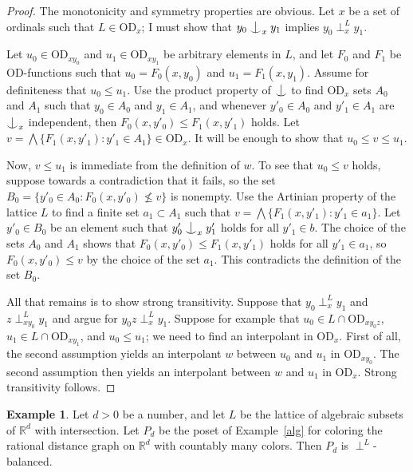 \documentclass{article}
\newcommand{\vd}{\mathrm{OD}}
\newcommand{\forkindep}[1][]{%
  \mathrel{
    \mathop{
      \vcenter{
        \hbox{\oalign{\noalign{\kern-.3ex}\hfil$\vert$\hfil\cr
              \noalign{\kern-.7ex}
              $\smile$\cr\noalign{\kern-.3ex}}}
      }
    }\displaylimits_{#1}
  }
}
\theoremstyle{definition}
\newtheorem{example}[theorem]{Example}
\begin{document}
\begin{proof}
The monotonicity and symmetry properties are obvious. Let $x$ be a set of ordinals such that $L\in\vd_x$; I must show that $y_0\forkindep_x y_1$ implies $y_0\perp^L_xy_1$.

Let $u_0\in \vd_{xy_0}$ and $u_1\in\vd_{xy_1}$ be arbitrary elements in $L$, and let $F_0$ and $F_1$ be $\vd$-functions such that $u_0=F_0(x, y_0)$ and $u_1=F_1(x, y_1)$. Assume for definiteness that $u_0\leq u_1$. Use the product property of $\forkindep$ to find $\vd_{x}$ sets $A_0$ and $A_1$ such that $y_0\in A_0$ and $y_1\in A_1$, and whenever $y'_0\in A_0$ and $y'_1\in A_1$ are $\forkindep_{x}$ independent, then $F_0(x, y'_0)\leq F_1(x, y'_1)$ holds. Let $v=\bigwedge\{F_1(x, y'_1)\colon y'_1\in A_1\}\in\vd_{x}$. It will be enough to show that $u_0\leq v\leq u_1$.

Now, $v\leq u_1$ is immediate from the definition of $w$. To see that $u_0\leq v$ holds, suppose towards a contradiction that it fails, so the set $B_0=\{y'_0\in A_0\colon F_0(x, y'_0)\not\leq v\}$ is nonempty. Use the Artinian property of the lattice $L$ to find a finite set $a_1\subset A_1$ such that $v=\bigwedge\{F_1(x, y'_1)\colon y'_1\in a_1\}$. Let $y'_0\in B_0$ be an element such that $y'_0\forkindep_{x}y'_1$ holds for all $y'_1\in b$. The choice of the sets $A_0$ and $A_1$ shows that $F_0(x, y'_0)\leq F_1(x, y'_1)$ holds for all $y'_1\in a_1$, so $F_0(x, y'_0)\leq v$ by the choice of the set $a_1$. This contradicts the definition of the set $B_0$.

All that remains is to show strong transitivity. Suppose that $y_0\perp^L_xy_1$ and $z\perp^L_{xy_0}y_1$ and argue for $y_0z\perp^L_xy_1$. Suppose for example that $u_0\in L\cap\vd_{xy_0z}$, $u_1\in L\cap \vd_{xy_1}$, and $u_0\leq u_1$; we need to find an interpolant in $\vd_x$. First of all, the second assumption yields an interpolant $w$ between $u_0$ and $u_1$ in $\vd_{xy_0}$. The second assumption then yields an interpolant between $w$ and $u_1$ in $\vd_x$. Strong transitivity follows.
\end{proof}

\begin{example}
\label{algd}
Let $d>0$ be a number, and let $L$ be the lattice of algebraic subsets of $\mathbb{R}^d$ with intersection. Let $P_d$ be the poset of Example~\ref{alg} for coloring the rational distance graph on $\mathbb{R}^d$ with countably many colors. Then $P_d$ is $\perp^L$-balanced.
\end{example}
\end{document}
